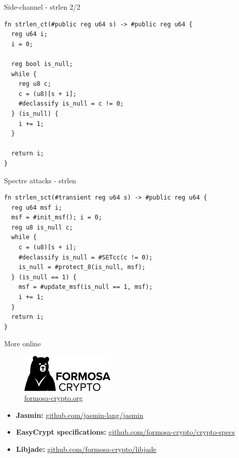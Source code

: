 \begin{frame}[fragile]{Side-channel - strlen 2/2}
  \lstset{
    language=Jasmin,
    basicstyle=\footnotesize\ttfamily,
  }
  \begin{lstlisting}
fn strlen_ct(#public reg u64 s) -> #public reg u64 {
  reg u64 i;
  i = 0;

  reg bool is_null;
  while {
    reg u8 c;
    c = (u8)[s + i];
    #declassify is_null = c != 0;
  } (is_null) {
    i += 1;
  }

  return i;
}
  \end{lstlisting}
\end{frame}

\begin{frame}[fragile]{Spectre attacks - strlen}
  \lstset{
    language=Jasmin,
    basicstyle=\footnotesize\ttfamily,
  }
  \begin{lstlisting}
fn strlen_sct(#transient reg u64 s) -> #public reg u64 {
  reg u64 msf i;
  msf = #init_msf(); i = 0;
  reg u8 is_null c;
  while {
    c = (u8)[s + i];
    #declassify is_null = #SETcc(c != 0);
    is_null = #protect_8(is_null, msf);
  } (is_null == 1) {
    msf = #update_msf(is_null == 1, msf);
    i += 1;
  }
  return i;
}
  \end{lstlisting}
\end{frame}

\begin{frame}{More online}
  \begin{center}
    \begin{figure}[t]
      \centering
      \includegraphics[width=0.4\textwidth]{formosa}
      \caption*{\Large \url{formosa-crypto.org}}
    \end{figure}
  \end{center}
  \vspace*{.5cm}
  \begin{itemize}
  \item[] \textbf{Jasmin:} \url{github.com/jasmin-lang/jasmin}
  \item[] \textbf{EasyCrypt specifications:}
    \url{github.com/formosa-crypto/crypto-specs}
  \item[] \textbf{Libjade:} \url{github.com/formosa-crypto/libjade}
  \end{itemize}
\end{frame}
